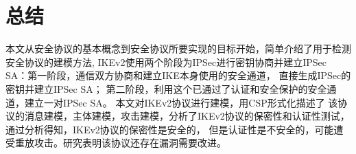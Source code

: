 \documentclass[UTF8]{ctexart}
\begin{document}
\section{总结}
\par{
	本文从安全协议的基本概念到安全协议所要实现的目标开始，简单介绍了用于检测安全协议的建模方法,
	IKEv2使用两个阶段为IPSec进行密钥协商并建立IPSec SA：第一阶段，通信双方协商和建立IKE本身使用的安全通道，
	直接生成IPSec的密钥并建立IPSec SA；
	第二阶段，利用这个已通过了认证和安全保护的安全通道，建立一对IPSec SA。
	本文对IKEv2协议进行建模，用CSP形式化描述了
	该协议的消息建模，主体建模，攻击建模，分析了IKEv2协议的保密性和认证性测试，通过分析得知，IKEv2协议的保密性是安全的，
	但是认证性是不安全的，可能遭受重放攻击。研究表明该协议还存在漏洞需要改进。
}


\end{document}
